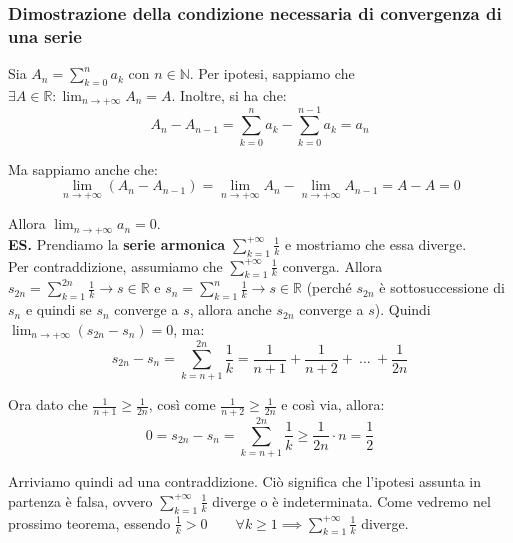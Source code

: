 \documentclass{article}
\begin{document}
\subsubsection{Dimostrazione della condizione necessaria di convergenza di una serie}
Sia $A_n = \sum_{k = 0}^n a_k$ con $n \in \mathbb{N}$. Per ipotesi, sappiamo che $\exists A \in \mathbb{R} : \lim_{n \to +\infty} A_n = A$. Inoltre, si ha che:
\begin{equation*}
    A_n - A_{n - 1} = \sum_{k = 0}^n a_k - \sum_{k = 0}^{n - 1} a_k = a_n
\end{equation*}

\noindent Ma sappiamo anche che:
\begin{equation*}
    \lim_{n \to +\infty} (A_n - A_{n - 1}) = \lim_{n \to +\infty} A_n - \lim_{n \to +\infty} A_{n - 1} = A - A = 0
\end{equation*}

\noindent Allora $\lim_{n \to +\infty} a_n = 0$.\\

\noindent\textbf{ES.} Prendiamo la \textbf{serie armonica} $\sum_{k = 1}^{+\infty} \frac{1}{k}$ e mostriamo che essa diverge.\\
Per contraddizione, assumiamo che $\sum_{k = 1}^{+\infty} \frac{1}{k}$ converga. Allora $s_{2n} = \sum_{k = 1}^{2n} \frac{1}{k} \to s \in \mathbb{R}$ e $s_n = \sum_{k = 1}^n \frac{1}{k} \to s \in \mathbb{R}$ (perché $s_{2n}$ è sottosuccessione di $s_n$ e quindi se $s_n$ converge a $s$, allora anche $s_{2n}$ converge a $s$). Quindi $\lim_{n \to +\infty} (s_{2n} - s_n) = 0$, ma:
\begin{equation*}
    s_{2n} - s_n = \sum_{k = n + 1}^{2n} \frac{1}{k} = \frac{1}{n + 1} + \frac{1}{n + 2} + \ ... \ + \frac{1}{2n}
\end{equation*}

\noindent Ora dato che $\frac{1}{n + 1} \geq \frac{1}{2n}$, così come $\frac{1}{n + 2} \geq \frac{1}{2n}$ e così via, allora:
\begin{equation*}
    0 = s_{2n} - s_n = \sum_{k = n + 1}^{2n} \frac{1}{k} \geq \frac{1}{2n} \cdot n = \frac{1}{2}
\end{equation*}

\noindent Arriviamo quindi ad una contraddizione. Ciò significa che l'ipotesi assunta in partenza è falsa, ovvero $\sum_{k = 1}^{+\infty} \frac{1}{k}$ diverge o è indeterminata. Come vedremo nel prossimo teorema, essendo $\frac{1}{k} > 0 \qquad \forall k \geq 1 \implies \sum_{k = 1}^{+\infty} \frac{1}{k}$ diverge.
\end{document}

